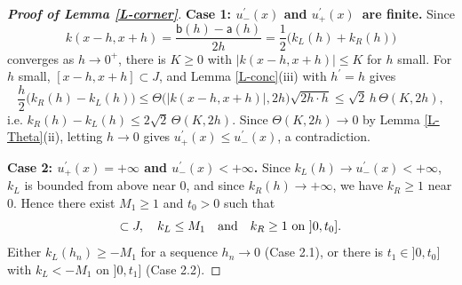 \documentclass[reqno,12pt]{amsart}
\numberwithin{equation}{section}
\theoremstyle{remark}
\begin{document}
\begin{proof}[\bf Proof of Lemma \ref{L-corner}]
\medskip

{\bf Case 1: \boldmath$u^\prime_-(x)$ and $u^\prime_+(x)$\unboldmath\ are finite.} Since
\begin{equation*}
k(x-h,x+h)=\frac{\mathsf b(h)-\mathsf a(h)}{2h}=\frac12\big(k_L(h)+k_R(h)\big)
\end{equation*}
converges as $h\to0^+$, there is $K\geq0$ with $|k(x-h,x+h)|\leq K$ for $h$ small. For $h$ small, $[x-h,x+h]\subset J$, and Lemma \ref{L-conc}(iii) with $h^\prime=h$ gives
\begin{equation*}
\frac h2\big(k_R(h)-k_L(h)\big)\leq\Theta\big(|k(x-h,x+h)|,2h\big)\sqrt{2h\cdot h}\leq\sqrt2\,h\,\Theta(K,2h),
\end{equation*}
i.e. $k_R(h)-k_L(h)\leq2\sqrt2\,\Theta(K,2h)$. Since $\Theta(K,2h)\to0$ by Lemma \ref{L-Theta}(ii), letting $h\to0$ gives $u^\prime_+(x)\leq u^\prime_-(x)$, a contradiction.

\medskip

{\bf Case 2: \boldmath$u^\prime_+(x)=+\infty$ and $u^\prime_-(x)<+\infty$\unboldmath.} Since $k_L(h)\to u^\prime_-(x)<+\infty$, $k_L$ is bounded from above near $0$, and since $k_R(h)\to+\infty$, we have $k_R\geq1$ near $0$. Hence there exist $M_1\geq1$ and $t_0>0$ such that
\begin{equation*}
[x-t_0,x+t_0]\subset J,\quad k_L\leq M_1\quad\hbox{and}\quad k_R\geq1\hbox{ on }]0,t_0].
\end{equation*}
Either $k_L(h_n)\geq-M_1$ for a sequence $h_n\to0$ (Case 2.1), or there is $t_1\in]0,t_0]$ with $k_L<-M_1$ on $]0,t_1]$ (Case 2.2).

\smallskip


\end{proof}
\end{document}
